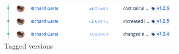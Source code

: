\begin{figure}[H]
    \centering
    \includegraphics[width=0.8\textwidth]{images/tagged-versions.png}
    \caption{Tagged versions}\label{fig:tagged_versions}
\end{figure}